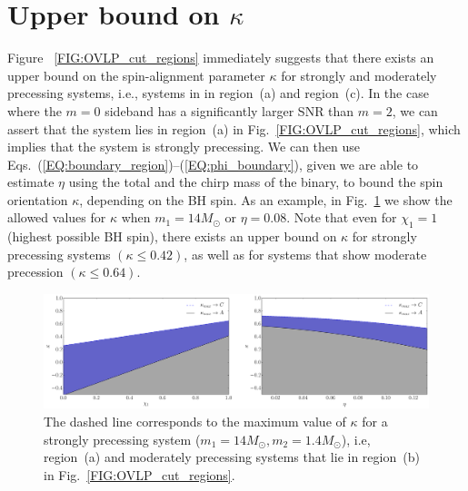 \section{Upper bound on $\kappa$}

Figure ~\ref{FIG:OVLP_cut_regions} immediately suggests that there exists an
upper bound on the spin-alignment parameter $\kappa$ for strongly and
moderately precessing systems, i.e., systems in in region~(a) and region~(c).
In the case where the $m=0$ sideband has a significantly larger SNR than
$m=2$, we can assert that the system lies in region~(a) in
Fig.~\ref{FIG:OVLP_cut_regions}, which implies that the system is strongly
precessing. We can then use
Eqs.~(\ref{EQ:boundary_region})--(\ref{EQ:phi_boundary}), given we are able to
estimate $\eta$ using the total and the chirp mass of the binary, to bound the
spin orientation $\kappa$, depending on the BH spin. As an example, in
Fig.~\ref{FIG:kappa_max_bounds} we show the allowed values for $\kappa$ when
$m_1 = 14 M_{\odot}$ or $\eta=0.08$.  Note that even for $\chi_1=1$ (highest
possible BH spin), there exists an upper bound on $\kappa$ for strongly
precessing systems $(\kappa\leq 0.42)$, as well as for systems that show
moderate precession $(\kappa
\leq 0.64)$.

\begin{figure}[!htbp]
\centering
\includegraphics[width=0.6\linewidth]{images/kappa_max_bound.pdf} 
\caption{\small{The dashed line corresponds to the maximum value of $\kappa$ for
    a strongly precessing system ($m_1 = 14 M_{\odot}, m_2 = 1.4 M_{\odot}$),
    i.e, region~(a) and moderately precessing systems that lie in region~(b)
    in Fig.~\ref{FIG:OVLP_cut_regions}.}}
\label{FIG:kappa_max_bounds}
\end{figure}
